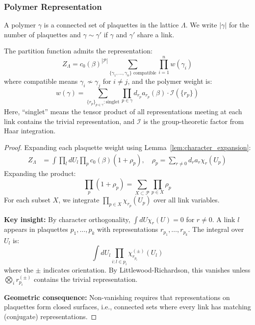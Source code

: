 \subsubsection{Polymer Representation}

\begin{definition}[Polymer]
A polymer $\gamma$ is a connected set of plaquettes in the lattice $\Lambda$. We write $|\gamma|$ for the number of plaquettes and $\gamma \sim \gamma'$ if $\gamma$ and $\gamma'$ share a link.
\end{definition}

\begin{lemma}
\label{lem:polymer_expansion}
The partition function admits the representation:
\begin{equation}
Z_\Lambda = c_0(\beta)^{|\mathcal{P}|} \sum_{\{\gamma_1, \ldots, \gamma_n\} \text{ compatible}} \prod_{i=1}^n w(\gamma_i)
\end{equation}
where compatible means $\gamma_i \not\sim \gamma_j$ for $i \neq j$, and the polymer weight is:
\begin{equation}
w(\gamma) = \sum_{\{r_p\}_{p \in \gamma} : \text{singlet}} \prod_{p \in \gamma} d_{r_p} a_{r_p}(\beta) \cdot \mathcal{I}(\{r_p\})
\end{equation}
Here, ``singlet'' means the tensor product of all representations meeting at each link contains the trivial representation, and $\mathcal{I}$ is the group-theoretic factor from Haar integration.
\end{lemma}

\begin{proof}
Expanding each plaquette weight using Lemma~\ref{lem:character_expansion}:
\begin{align}
Z_\Lambda &= \int \prod_l dU_l \prod_p c_0(\beta)(1 + \rho_p), \quad \rho_p = \sum_{r \neq 0} d_r a_r \chi_r(U_p)
\end{align}
Expanding the product:
\begin{equation}
\prod_p (1 + \rho_p) = \sum_{X \subset \mathcal{P}} \prod_{p \in X} \rho_p
\end{equation}
For each subset $X$, we integrate $\prod_{p \in X} \chi_{r_p}(U_p)$ over all link variables.

\textbf{Key insight:} By character orthogonality, $\int dU \chi_r(U) = 0$ for $r \neq 0$. A link $l$ appears in plaquettes $p_1, \ldots, p_k$ with representations $r_{p_1}, \ldots, r_{p_k}$. The integral over $U_l$ is:
\begin{equation}
\int dU_l \prod_{i: l \in p_i} \chi_{r_{p_i}}^{(\pm)}(U_l)
\end{equation}
where the $\pm$ indicates orientation. By Littlewood-Richardson, this vanishes unless $\bigotimes_i r_{p_i}^{(\pm)}$ contains the trivial representation.

\textbf{Geometric consequence:} Non-vanishing requires that representations on plaquettes form closed surfaces, i.e., connected sets where every link has matching (conjugate) representations.
\end{proof}

